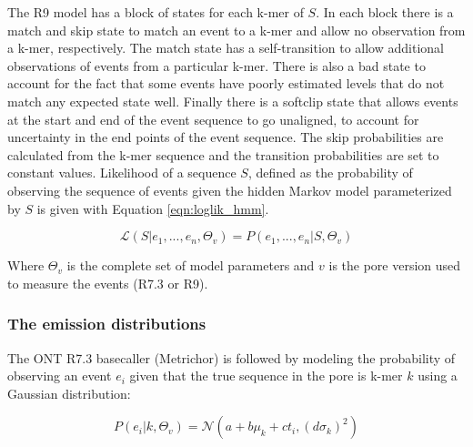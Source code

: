 
The R9 model has a block of states for each k-mer of $S$. In each block there is a match and skip state to match an event to a k-mer and allow no observation from a k-mer, respectively. The match state has a self-transition to allow additional observations of events from a particular k-mer. There is also a bad state to account for the fact that some events have poorly estimated levels that do not match any expected state well. Finally there is a softclip state that allows events at the start and end of the event sequence to go unaligned, to account for uncertainty in the end points of the event sequence. The skip probabilities are calculated from the k-mer sequence and the transition probabilities are set to constant values. Likelihood of a sequence $S$, defined as the probability of observing the sequence of events given the hidden Markov model parameterized by $S$ is given with Equation \ref{eqn:loglik_hmm}.

\begin{equation}
    \label{eqn:loglik_hmm}
    \mathcal{L}(S|e_1,...,e_n,\Theta_v) = P(e_1,...,e_n | S,\Theta_v)
\end{equation}

Where $\Theta_v$ is the complete set of model parameters and $v$ is the pore version used to measure the events (R7.3 or R9).

\subsubsection{The emission distributions}

The ONT R7.3 basecaller (Metrichor) is followed by modeling the probability of observing an event $e_i$ given that the true sequence in the pore is k-mer $k$ using a Gaussian distribution:

\begin{equation}
    \label{eqn:emission_distribution}
    P(e_i|k,\Theta_v) = \mathcal{N}(a+b\mu_k + ct_i, (d\sigma_k)^2)
\end{equation}

